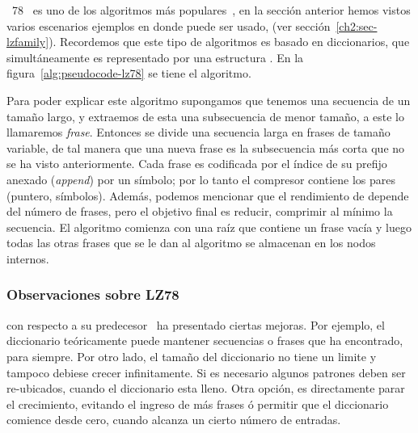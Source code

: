 % 
% 
%
%
\lempelziv~78~\cite{ZivLempel1978} es uno de los algoritmos \LDC más populares~\cite{Begleiter2004}, en la sección anterior hemos vistos varios escenarios ejemplos en donde puede ser usado, (ver sección~\ref{ch2:sec-lzfamily}). Recordemos que este tipo de algoritmos es basado en diccionarios, que simultáneamente es representado por una estructura \trie. En la figura~\ref{alg:pseudocode-lz78} se tiene el algoritmo.



Para poder explicar este algoritmo supongamos que tenemos una secuencia de un tamaño largo, y extraemos de esta una subsecuencia de menor tamaño, a este lo llamaremos \emph{frase}. Entonces se divide una secuencia larga en frases de tamaño variable, de tal manera que una nueva frase es la subsecuencia más corta que no se ha visto anteriormente. Cada frase es codificada por el índice de su prefijo anexado (\emph{append}) por un símbolo; por lo tanto el compresor contiene los pares (puntero, símbolos). Además, podemos mencionar que el  rendimiento de \lzSieteOcho depende del número de frases, pero el objetivo final es reducir, comprimir al mínimo la secuencia. El algoritmo comienza con una raíz que contiene un frase vacía y luego todas las otras frases que se le dan al algoritmo se almacenan en los nodos internos. 



\subsubsection{Observaciones sobre LZ78}

\lzSieteOcho con respecto a su predecesor~\cite{ZivLempel1977} ha presentado ciertas mejoras. Por ejemplo, el diccionario teóricamente puede mantener secuencias o frases que ha encontrado, para siempre. Por otro lado,  el tamaño del diccionario no tiene un limite y tampoco  debiese crecer infinitamente. Si es necesario algunos patrones deben ser re-ubicados, cuando el diccionario esta lleno. Otra opción, es directamente parar el crecimiento, evitando el ingreso de más frases ó permitir que el diccionario comience desde cero, cuando alcanza un cierto número de entradas. 
\newline

